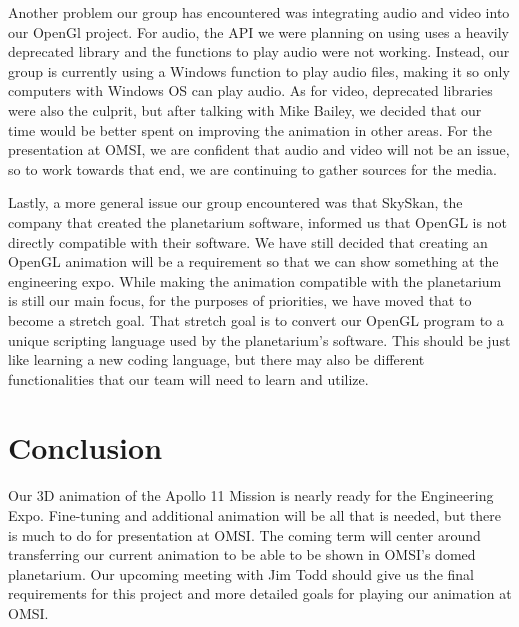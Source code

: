 \documentclass[onecolumn, draftclsnofoot,10pt, compsoc]{IEEEtran}
\begin{document}
Another problem our group has encountered was integrating audio and video into our OpenGl project. For audio, the API we were planning on using uses a heavily deprecated library and the functions to play audio were not working. Instead, our group is currently using a Windows function to play audio files, making it so only computers with Windows OS can play audio. As for video, deprecated libraries were also the culprit, but after talking with Mike Bailey, we decided that our time would be better spent on improving the animation in other areas. For the presentation at OMSI, we are confident that audio and video will not be an issue, so to work towards that end, we are continuing to gather sources for the media. 

Lastly, a more general issue our group encountered was that SkySkan, the company that created the planetarium software, informed us that OpenGL is not directly compatible with their software. We have still decided that creating an OpenGL animation will be a requirement so that we can show something at the engineering expo. While making the animation compatible with the planetarium is still our main focus, for the purposes of priorities, we have moved that to become a stretch goal. That stretch goal is to convert our OpenGL program to a unique scripting language used by the planetarium's software. This should be just like learning a new coding language, but there may also be different functionalities that our team will need to learn and utilize. 

\section{Conclusion}

Our 3D animation of the Apollo 11 Mission is nearly ready for the Engineering Expo. Fine-tuning and additional animation will be all that is needed, but there is much to do for presentation at OMSI. The coming term will center around transferring our current animation to be able to be shown in OMSI's domed planetarium. Our upcoming meeting with Jim Todd should give us the final requirements for this project and more detailed goals for playing our animation at OMSI. 
\end{document}
